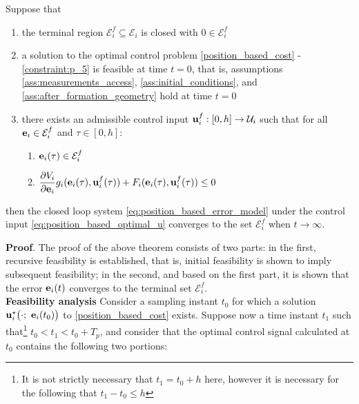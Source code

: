 \begin{bw_box}
\begin{theorem}

  Suppose that

  \begin{enumerate}
    \item the terminal region $\mathcal{E}_i^f \subseteq \mathcal{E}_i$ is
      closed with $0 \in \mathcal{E}_i^f$
    \item a solution to the optimal control problem \eqref{position_based_cost} -
      \eqref{constraint:p_5} is feasible at time $t=0$, that is, assumptions
      \eqref{ass:measurements_access}, \eqref{ass:initial_conditions}, and
      \eqref{ass:after_formation_geometry} hold at time $t=0$
    \item there exists an admissible control input
      $\bm{\mathbf{u}}_i^f : [0, h] \to \mathcal{U}_i$ such that for all
      $\bm{\mathbf{e}}_i \in \mathcal{E}_i^f$ and $\tau \in [0,h]$:

      \begin{enumerate}
        \item $\bm{\mathbf{e}}_i(\tau) \in \mathcal{E}_i^f$
        \item $\dfrac{\partial V_i}{\partial \bm{\mathbf{e}}_i} g_i(\bm{\mathbf{e}}_i(\tau), \bm{\mathbf{u}}_i^f(\tau)) + F_i(\bm{\mathbf{e}}_i(\tau), \bm{\mathbf{u}}_i^f(\tau)) \leq 0$
      \end{enumerate}

  \end{enumerate}

  then the closed loop system \eqref{eq:position_based_error_model} under the
  control input \eqref{eq:position_based_optimal_u} converges to the set
  $\mathcal{E}_i^f$ when $t \to \infty$.

\end{theorem}
\end{bw_box}

\textbf{Proof}. The proof of the above theorem consists of two parts:
in the first, recursive feasibility is established, that is, initial
feasibility is shown to imply subsequent feasibility; in the second, and based
on the first part, it is shown that the error $\bm{\mathbf{e}}_i(t)$ converges to the
terminal set $\mathcal{E}_i^f$.\\

\textbf{Feasibility analysis}
Consider a sampling instant $t_0$ for which a
solution $\vect{u}_i^{\star}\big(\cdot;\ \vect{e}_i(t_0)\big)$ to
\eqref{position_based_cost} exists.
Suppose now a time instant $t_1$ such that\footnote{It is not strictly necessary
that $t_1 = t_0 + h$ here, however it is necessary for the following that
$t_1 - t_0 \leq h$} $t_0 < t_1 < t_0 + T_p$, and consider that the
optimal control signal calculated at $t_0$ contains the following two portions:

